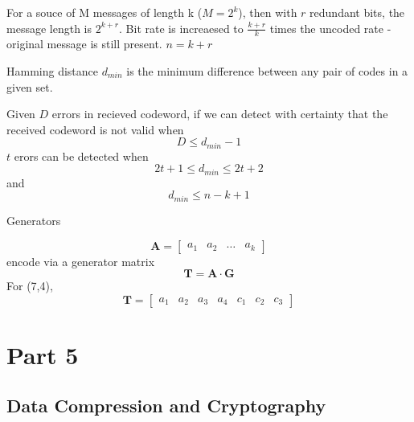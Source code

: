 \documentclass[a4paper,twocolumn]{article}
\begin{document}
				For a souce of M messages of length k ($M=2^k$), then with $r$ redundant bits, the message length is $2^{k+r}$. Bit rate is increaesed to $\frac{k+r}{k}$ times the uncoded rate - original message is still present. $n=k+r$

				Hamming distance $d_{min}$ is the minimum difference between any pair of codes in a given set.

				Given $D$ errors in recieved codeword, if we can detect with certainty that the received codeword is not valid when
				\begin{equation}
					D \le d_{min} -1
				\end{equation}
				 $t$ erors can be detected when
				 \begin{equation}
				 	2t+1 \le d_{min} \le 2t+2
				 \end{equation}
				 and
				 \begin{equation}
				 	d_{min} \le n-k+1
				 \end{equation}

				 Generators

				 \begin{equation}
				 	\mathbf{A} = \begin{bmatrix} a_1 & a_2 & \ldots & a_k \end{bmatrix}
				 \end{equation}
				 encode via a generator matrix
				 \begin{equation}
				 	\mathbf{T} = \mathbf{A} \cdot \mathbf{G}
				 \end{equation}
				 For (7,4),
				 \begin{equation}
				 	\mathbf{T} = \begin{bmatrix} a_1 & a_2 & a_3& a_4 & c_1& c_2& c_3\end{bmatrix}
				 \end{equation}


\section{Part 5}
\subsection{Data Compression and Cryptography}
\end{document}
